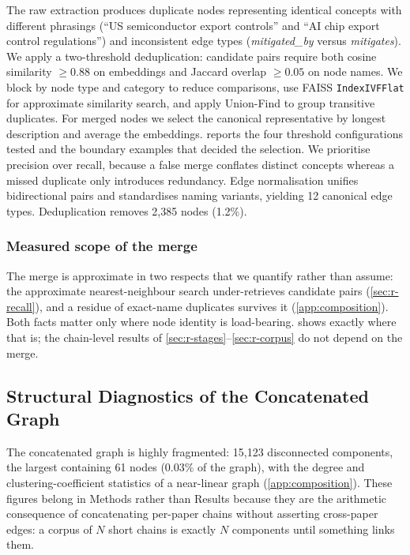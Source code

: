 \documentclass[10pt,twocolumn,letterpaper]{article}
\begin{document}
The raw extraction produces duplicate nodes representing identical concepts with
different phrasings (``US semiconductor export controls'' and ``AI chip export control
regulations'') and inconsistent edge types (\textit{mitigated\_by} versus
\textit{mitigates}). We apply a two-threshold deduplication: candidate pairs require
both cosine similarity $\geq 0.88$ on embeddings and Jaccard overlap $\geq 0.05$ on node
names. We block by node type and category to reduce comparisons, use FAISS
\texttt{IndexIVFFlat} for approximate similarity search, and apply Union-Find to group
transitive duplicates. For merged nodes we select the canonical representative by
longest description and average the embeddings.  reports the four
threshold configurations tested and the boundary examples that decided the selection. We
prioritise precision over recall, because a false merge conflates distinct concepts
whereas a missed duplicate only introduces redundancy. Edge normalisation unifies
bidirectional pairs and standardises naming variants, yielding 12 canonical edge types.
Deduplication removes 2{,}385 nodes (1.2\%).

\subsubsection{Measured scope of the merge}

The merge is approximate in two respects that we quantify rather than assume: the
approximate nearest-neighbour search under-retrieves candidate pairs
(\cref{sec:r-recall}), and a residue of exact-name duplicates survives it
(\cref{app:composition}). Both facts matter only where node identity is load-bearing.
 shows exactly where that is; the chain-level results of
\cref{sec:r-stages}--\cref{sec:r-corpus} do not depend on the merge.

\subsection{Structural Diagnostics of the Concatenated Graph}
\label{sec:m-structural}

The concatenated graph is highly fragmented: 15{,}123 disconnected components, the
largest containing 61 nodes (0.03\% of the graph), with the degree and
clustering-coefficient statistics of a near-linear graph (\cref{app:composition}).
These figures belong in Methods rather than Results because they are the arithmetic
consequence of concatenating per-paper chains without asserting cross-paper edges: a
corpus of $N$ short chains is exactly $N$ components until something links them.
\end{document}
